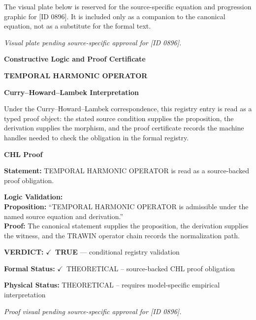 \begingroup\footnotesize\sloppy
The visual plate below is reserved for the source-specific equation and progression graphic for [ID 0896]. It is included only as a companion to the canonical equation, not as a substitute for the formal text.
\par\endgroup
\begingroup\footnotesize\itshape
Visual plate pending source-specific approval for [ID 0896].
\par\endgroup

\clearpage
\begingroup\tzpsupportsetup
\noindent\textbf{\fontsize{10.8pt}{12.8pt}\selectfont [ID 0896] Constructive Logic and Proof Certificate}\par
\noindent\textbf{\fontsize{10pt}{12pt}\selectfont TEMPORAL HARMONIC OPERATOR}\par
\vspace{0.45em}
\begingroup
\footnotesize
\setlength{\parskip}{0.22em}
\setlength{\parindent}{0pt}
\noindent\textbf{Curry--Howard--Lambek Interpretation}\par
Under the Curry--Howard--Lambek correspondence, this registry entry is read as a typed proof
object: the stated source condition supplies the proposition, the derivation supplies the
morphism, and the proof certificate records the machine handles needed to check the obligation
in the formal registry.

\vspace{0.45em}
\noindent\textbf{CHL Proof}\par
\textbf{Statement:} TEMPORAL HARMONIC OPERATOR is read as a source-backed proof obligation.

\textbf{Logic Validation:}\\
\textbf{Proposition:} ``TEMPORAL HARMONIC OPERATOR is admissible under the named source equation and derivation.''\\
\textbf{Proof:} The canonical statement supplies the proposition, the derivation supplies the witness, and the TRAWIN operator chain records the normalization path.

\textbf{VERDICT:} \ensuremath{\checkmark}\ \textbf{TRUE} --- conditional registry validation

\textbf{Formal Status:} \ensuremath{\checkmark}\ THEORETICAL -- source-backed CHL proof obligation

\textbf{Physical Status:} THEORETICAL -- requires model-specific empirical interpretation
\par\vspace{0.45em}
\par
\vfill
\begingroup\footnotesize\itshape
Proof visual pending source-specific approval for [ID 0896].
\par\endgroup
\vfill
\endgroup
\endgroup
